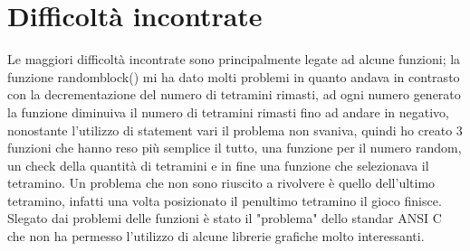 \documentclass[12pt, letterpaper]{article}
\begin{document}
\section{Difficoltà incontrate}

Le maggiori difficoltà incontrate sono principalmente legate ad alcune funzioni;
la funzione randomblock() mi ha dato molti problemi in quanto andava in contrasto con 
la decrementazione del numero di tetramini rimasti, ad ogni numero generato la funzione diminuiva 
il numero di tetramini rimasti fino ad andare in negativo, nonostante l'utilizzo di statement vari 
il problema non svaniva, quindi ho creato 3 funzioni che hanno reso più semplice il tutto, una funzione 
per il numero random, un check della quantità di tetramini e in fine una funzione che selezionava il tetramino.
Un problema che non sono riuscito a rivolvere è quello dell'ultimo tetramino, infatti 
una volta posizionato il penultimo tetramino il gioco finisce.
\\Slegato dai problemi delle funzioni è stato il "problema" dello standar ANSI C che non ha permesso 
l'utilizzo di alcune librerie grafiche molto interessanti. 
\end{document}
